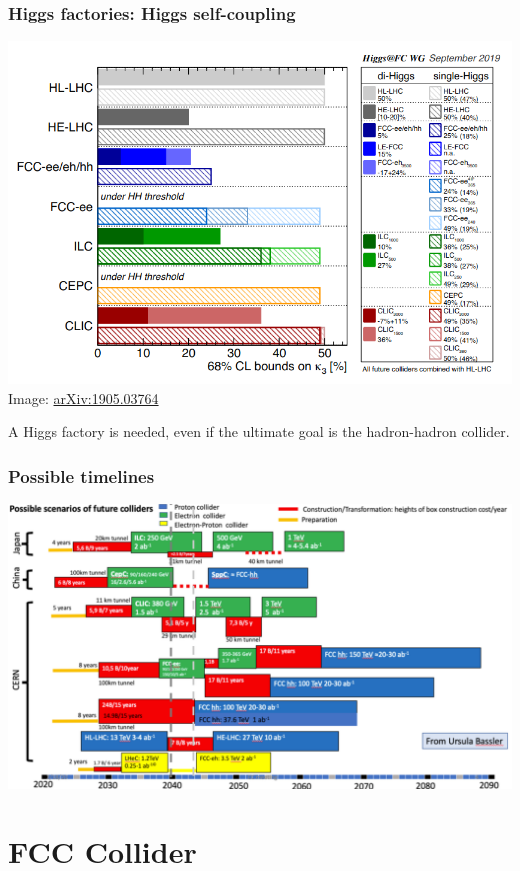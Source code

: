 \documentclass[aspectratio=169]{beamer}
\begin{document}
\begin{frame}
  \frametitle{Higgs factories: Higgs self-coupling}

  \begin{center}
    \includegraphics[width=0.6\linewidth]{figures/higgs_selfCoupling.png}\\
    \tiny{Image: \href{https://arxiv.org/abs/1905.03764}{arXiv:1905.03764}}
  \end{center}
  \pause

  A Higgs factory is needed, even if the ultimate goal is the hadron-hadron collider.\\
\end{frame}


\begin{frame}
  \frametitle{Possible timelines}
  \begin{center}
    \includegraphics[width=0.8\linewidth]{figures/timeline-EPPSU2020.png}\\
  \end{center}
\end{frame}

%
%
\section{FCC Collider}
\end{document}
